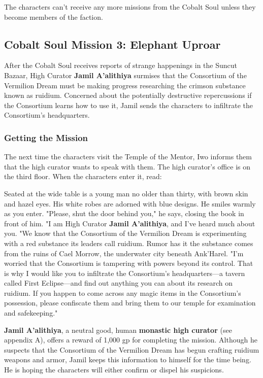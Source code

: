 \documentclass[10pt,a4,twoside,twocolumn,openany,nodeprecatedcode]{dndbook}
\begin{document}
The characters can't receive any more missions from the Cobalt Soul unless they become members of the faction.
\subsection{Cobalt Soul Mission 3: Elephant Uproar}
After the Cobalt Soul receives reports of strange happenings in the Suncut Bazaar, High Curator \textbf{Jamil A'alithiya} surmises that the Consortium of the Vermilion Dream must be making progress researching the crimson substance known as ruidium. Concerned about the potentially destructive repercussions if the Consortium learns how to use it, Jamil sends the characters to infiltrate the Consortium's headquarters.
\subsubsection{Getting the Mission}
The next time the characters visit the Temple of the Mentor, Iwo informs them that the high curator wants to speak with them. The high curator's office is on the third floor. When the characters enter it, read:
\begin{DndReadAloud}{}
Seated at the wide table is a young man no older than thirty, with brown skin and hazel eyes. His white robes are adorned with blue designs.
He smiles warmly as you enter. "Please, shut the door behind you," he says, closing the book in front of him. "I am High Curator \textbf{Jamil A'alithiya}, and I've heard much about you.
"We know that the Consortium of the Vermilion Dream is experimenting with a red substance its leaders call ruidium. Rumor has it the substance comes from the ruins of Cael Morrow, the underwater city beneath Ank'Harel.
"I'm worried that the Consortium is tampering with powers beyond its control. That is why I would like you to infiltrate the Consortium's headquarters—a tavern called First Eclipse—and find out anything you can about its research on ruidium. If you happen to come across any magic items in the Consortium's possession, please confiscate them and bring them to our temple for examination and safekeeping."
\end{DndReadAloud}

\textbf{Jamil A'alithiya}, a neutral good, human \textbf{monastic high curator} (see appendix A), offers a reward of 1,000 gp for completing the mission.
Although he suspects that the Consortium of the Vermilion Dream has begun crafting ruidium weapons and armor, Jamil keeps this information to himself for the time being. He is hoping the characters will either confirm or dispel his suspicions.
\end{document}
